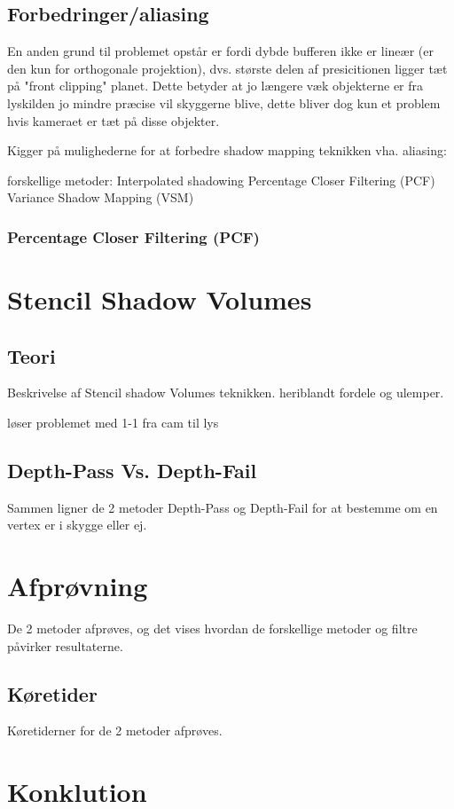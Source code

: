 \documentclass[11pt,a4paper]{article}
\begin{document}
\newpage 

\subsection{Forbedringer/aliasing}



En anden grund til problemet opstår er fordi dybde bufferen ikke er lineær (er den kun for orthogonale projektion), dvs. største delen af presicitionen ligger tæt på "front clipping" planet. Dette betyder at jo længere væk objekterne er fra lyskilden jo mindre præcise vil skyggerne blive, dette bliver dog kun et problem hvis kameraet er tæt på disse objekter. 




Kigger på mulighederne for at forbedre shadow mapping teknikken vha. aliasing:

forskellige metoder:
Interpolated shadowing
Percentage Closer Filtering (PCF)
Variance Shadow Mapping (VSM)


\subsubsection{Percentage Closer Filtering (PCF)}

\section{Stencil Shadow Volumes}

\subsection{Teori}
Beskrivelse af Stencil shadow Volumes teknikken. heriblandt fordele og ulemper.

løser problemet med 1-1 fra cam til lys

\subsection{Depth-Pass Vs. Depth-Fail}
Sammen ligner de 2 metoder Depth-Pass og Depth-Fail for at bestemme om en vertex er i skygge eller ej.


\section{Afprøvning}
 De 2 metoder afprøves, og det vises hvordan de forskellige metoder og filtre påvirker resultaterne.	

\subsection{Køretider}
Køretiderner for de 2 metoder afprøves.

\section{Konklution}
\end{document}
